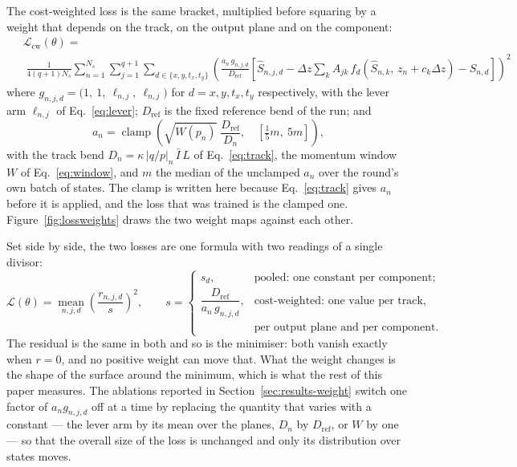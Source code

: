 \documentclass[11pt,a4paper]{article}
\begin{document}
The cost-weighted loss is the same bracket, multiplied before squaring by a
weight that depends on the track, on the output plane and on the component:
%
\begin{equation}
  \boxed{\;
  \begin{aligned}
    &\mathcal{L}_{\mathrm{cw}}(\theta) = \\[2pt]
    &\; \frac{1}{4(q+1)N_s}
      \sum_{n=1}^{N_s} \sum_{j=1}^{q+1}
      \sum_{d \in \{x, y, t_x, t_y\}}
      \left(\frac{a_n\,g_{n,j,d}}{D_{\mathrm{ref}}}
      \left[\hat{S}_{n,j,d}
        - \Delta z \sum_{k} A_{jk}\,
          f_d(\hat{S}_{n,k},\, z_n + c_k \Delta z)
        - S_{n,d}\right]\right)^{\!2}
  \end{aligned}\;}
  \label{eq:cw-full}
\end{equation}
%
where $g_{n,j,d} = \big(1,\ 1,\ \ell_{n,j},\ \ell_{n,j}\big)$ for
$d = x, y, t_x, t_y$ respectively, with the lever arm $\ell_{n,j}$ of
Eq.~\eqref{eq:lever}; $D_{\mathrm{ref}}$ is the fixed reference bend of the
run; and
%
\[
  a_n = \operatorname{clamp}\!\left(
    \sqrt{W(p_n)}\;\frac{D_{\mathrm{ref}}}{D_n},\quad
    \left[\tfrac{1}{5}m,\ 5m\right]\right),
\]
%
with the track bend $D_n = \kappa\,|q/p|_n\,\bar{I}\,L$ of
Eq.~\eqref{eq:track}, the momentum window $W$ of Eq.~\eqref{eq:window}, and $m$
the median of the unclamped $a_n$ over the round's own batch of states. The
clamp is written here because Eq.~\eqref{eq:track} gives $a_n$ before it is
applied, and the loss that was trained is the clamped one.
Figure~\ref{fig:lossweights} draws the two weight maps against each other.

Set side by side, the two losses are one formula with two readings of a single
divisor:
%
\begin{equation}
  \mathcal{L}(\theta) = \operatorname*{mean}_{n,j,d}
    \left(\frac{r_{n,j,d}}{s}\right)^{\!2},
  \qquad
  s = \begin{cases}
    s_d, & \text{pooled: one constant per component;}\\[4pt]
    \dfrac{D_{\mathrm{ref}}}{a_n\,g_{n,j,d}}, &
      \text{cost-weighted: one value per track,}\\
      & \text{per output plane and per component.}
  \end{cases}
  \label{eq:unify}
\end{equation}
%
The residual is the same in both and so is the minimiser: both vanish exactly
when $r = 0$, and no positive weight can move that. What the weight changes is
the shape of the surface around the minimum, which is what the rest of this
paper measures. The ablations reported in Section~\ref{sec:results-weight}
switch one factor of $a_n g_{n,j,d}$ off at a time by replacing the quantity
that varies with a constant --- the lever arm by its mean over the planes,
$D_n$ by $D_{\mathrm{ref}}$, or $W$ by one --- so that the overall size of the
loss is unchanged and only its distribution over states moves.
\end{document}

